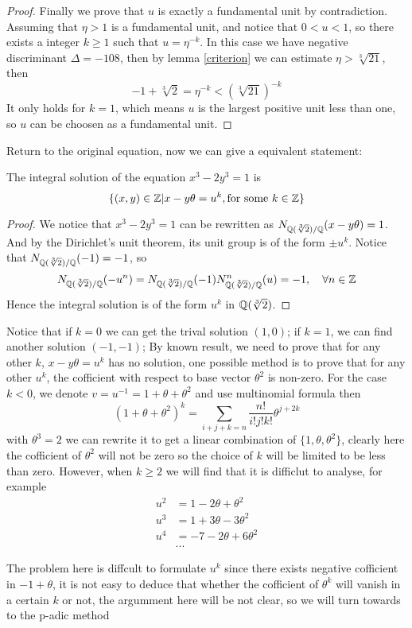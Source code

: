 \begin{proposition}
\begin{proof}
        Finally we prove that \(u\) is exactly a fundamental unit by contradiction. Assuming that \(\eta>1\) is a fundamental unit, and notice that \(0<u<1\), so there exists a integer \(k \geq 1\) such that \(u = \eta^{-k}\). In this case we have negative discriminant \(\Delta = -108\), then by lemma \ref{criterion} we can estimate \(\eta > \sqrt[3]{21}\), then 
        \[-1 + \sqrt[3]{2} = \eta^{-k} < (\sqrt[3]{21})^{-k}\]
        It only holds for \(k=1\), which means \(u\) is the largest positive unit less than one, so \(u\) can be choosen as a fundamental unit.
        
    \end{proof}
\end{proposition}

Return to the original equation, now we can give a equivalent statement:
\begin{proposition} \label{equi}
    The integral solution of the equation \(x^3-2y^3=1\) is
    \[\{(x,y)\in \mathbb{Z}| x-y\theta = u^k, \text{for some } k \in \mathbb{Z}\}\]

    \begin{proof}
        We notice that \(x^3-2y^3 = 1 \) can be rewritten as \(N_{\mathbb{Q}(\sqrt[3]{2}) / \mathbb{Q}}(x-y\theta) = 1\). And by the Dirichlet's unit theorem, its unit group is of the form \(\pm u^k\). Notice that \(N_{\mathbb{Q}(\sqrt[3]{2}) / \mathbb{Q}}(-1) = -1\), so
        \[N_{\mathbb{Q}(\sqrt[3]{2}) / \mathbb{Q}}(-u^n) = N_{\mathbb{Q}(\sqrt[3]{2}) / \mathbb{Q}}(-1)N_{\mathbb{Q}(\sqrt[3]{2}) / \mathbb{Q}}^n(u) = -1, \quad \forall n \in \mathbb{Z} \]
        Hence the integral solution is of the form \(u^k\) in \(\mathbb{Q}(\sqrt[3]{2})\).
    \end{proof}
\end{proposition}

Notice that if \(k=0\) we can get the trival solution \((1,0)\); if \(k=1\), we can find another solution \((-1,-1)\); By known result, we need to prove that for any other \(k\), \(x-y\theta = u^k\) has no solution, one possible method is to prove that for any other \(u^k\), the cofficient with respect to base vector \(\theta^2\) is non-zero. For the case \(k<0\), we denote \(v=u^{-1} = 1+\theta +\theta^2\) and use multinomial formula then
\[(1+\theta+ \theta^2)^k = \sum_{i+j+k=n} \frac{n!}{i!j!k!}\theta ^{j+2k}\]
with \(\theta ^3= 2\) we can rewrite it to get a linear combination of \(\{1,\theta,\theta ^2\}\), clearly here the cofficient of \(\theta ^2\) will not be zero so the choice of \(k\) will be limited to be less than zero. However, when \(k \geq  2\) we will find that it is difficlut to analyse, for example
\begin{align*}
    u^2 &= 1- 2\theta +\theta^2 \\
    u^3 &= 1+3\theta-3\theta^2 \\
    u^4 &= -7-2\theta+6\theta^2\\
    &...
\end{align*}
 
The problem here is diffcult to formulate \(u^{k}\) since there exists negative cofficient in \(-1+\theta\), it is not easy to deduce that whether the cofficient of \(\theta^k\) will vanish in a certain \(k\) or not, the argumment here will be not clear, so we will turn towards to the p-adic method
